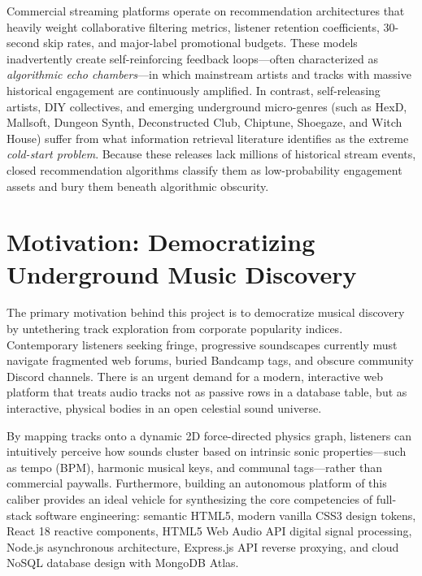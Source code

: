 \documentclass[12pt,a4paper,oneside]{report}
\begin{document}
Commercial streaming platforms operate on recommendation architectures that heavily weight collaborative filtering metrics, listener retention coefficients, 30-second skip rates, and major-label promotional budgets. These models inadvertently create self-reinforcing feedback loops---often characterized as \textit{algorithmic echo chambers}---in which mainstream artists and tracks with massive historical engagement are continuously amplified. In contrast, self-releasing artists, DIY collectives, and emerging underground micro-genres (such as HexD, Mallsoft, Dungeon Synth, Deconstructed Club, Chiptune, Shoegaze, and Witch House) suffer from what information retrieval literature identifies as the extreme \textit{cold-start problem}. Because these releases lack millions of historical stream events, closed recommendation algorithms classify them as low-probability engagement assets and bury them beneath algorithmic obscurity.

\section{Motivation: Democratizing Underground Music Discovery}
The primary motivation behind this project is to democratize musical discovery by untethering track exploration from corporate popularity indices. Contemporary listeners seeking fringe, progressive soundscapes currently must navigate fragmented web forums, buried Bandcamp tags, and obscure community Discord channels. There is an urgent demand for a modern, interactive web platform that treats audio tracks not as passive rows in a database table, but as interactive, physical bodies in an open celestial sound universe.

By mapping tracks onto a dynamic 2D force-directed physics graph, listeners can intuitively perceive how sounds cluster based on intrinsic sonic properties---such as tempo (BPM), harmonic musical keys, and communal tags---rather than commercial paywalls. Furthermore, building an autonomous platform of this caliber provides an ideal vehicle for synthesizing the core competencies of full-stack software engineering: semantic HTML5, modern vanilla CSS3 design tokens, React 18 reactive components, HTML5 Web Audio API digital signal processing, Node.js asynchronous architecture, Express.js API reverse proxying, and cloud NoSQL database design with MongoDB Atlas.
\end{document}
